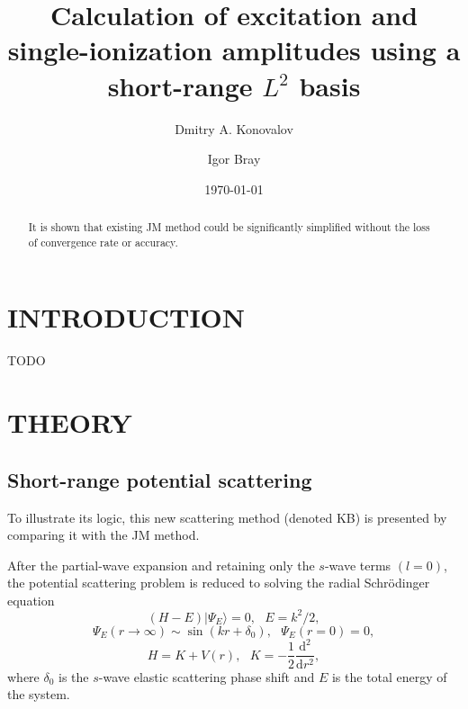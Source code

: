 \documentclass[aip
, pra
, showpacs
, aps
, twocolumn
, groupedaddress
, floatfix
]{revtex4}
\newcommand{\beq}{\begin{equation}}
\newcommand{\eeq}{\end{equation}}
\begin{document}
\title {Calculation of excitation and single-ionization amplitudes using a short-range $L^2$ basis}

\author{Dmitry A. Konovalov}

\author{Igor Bray}


\date{\today}

\begin{abstract}
It is shown that existing JM method could be significantly simplified without the loss of convergence rate or accuracy.

\end{abstract}

\maketitle

\section{INTRODUCTION}
TODO

\section{THEORY}
\subsection{Short-range potential scattering}
To illustrate its logic, this new scattering method (denoted KB) is presented by comparing it with the JM method.


After the partial-wave expansion and retaining only the $s$-wave terms $(l=0)$,
the potential scattering problem is reduced \cite{LL85, Taylor72} to solving the radial Schr\"odinger equation
\beq
(H-E) | \Psi_E \rangle =0, \ \ \ E=k^2/2,  \label{H_E_Psi_E}
\eeq
\beq
\Psi_E(r \rightarrow \infty) \sim \sin(kr+\delta_0), \ \ \ \Psi_E(r= 0)=0,
\eeq
\beq
H=K+V(r), \ \ \ K=-\frac{1}{2} \frac{\mbox{d}^2}{\mbox{d}r^2}, \label{K}
\eeq
where $\delta_0$ is the $s$-wave elastic scattering phase shift and $E$ is the total energy of the system.
\end{document}
